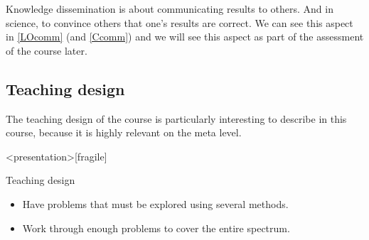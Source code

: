 Knowledge dissemination is about communicating results to others.
And in science, to convince others that one's results are correct.
We can see this aspect in \ref{LOcomm} (and \ref{Ccomm}) and we will see this 
aspect as part of the assessment of the course later.


\subsection{Teaching design}

The teaching design of the course is particularly interesting to describe in 
this course, because it is highly relevant on the meta level.

\begin{frame}<presentation>[fragile]
  \begin{block}{Teaching design}
    \begin{itemize}
      \item Have problems that must be explored using several 
        methods.
      \item Work through enough problems to cover the entire spectrum.
    \end{itemize}
  \end{block}


\end{frame}

